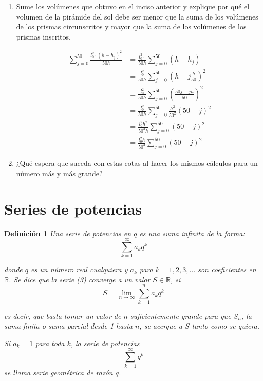 \documentclass[12pt]{article}
\begin{document}
\begin{enumerate}
    \item Sume los volúmenes que obtuvo en el inciso anterior y explique por qué el volumen de la pirámide del sol debe ser menor que la suma de los volúmenes de los prismas circunscritos y mayor que la suma de los volúmenes de los prismas inscritos.
  
        \begin{align*}
            \sum_{j=0}^{50} \frac{l_0^2 \cdot (h - h_j)^2}{50h} &= \frac{l_0^2 \cdot }{50h}  \sum_{j=0}^{50}(h - h_j)\\
            &= \frac{l_0^2}{50h}  \sum_{j=0}^{50} \left(h -j \frac{h}{50} \right)^2\\
            &= \frac{l_0^2}{50h}  \sum_{j=0}^{50} \left(\frac{50j-jh}{50} \right)^2\\
            &= \frac{l_0^2}{50h}  \sum_{j=0}^{50} \frac{h^2}{50^2} \left(50-j \right)^2\\
            &= \frac{l_0^2 h^2}{50^3h}  \sum_{j=0}^{50} \left(50-j \right)^2\\
            &= \frac{l_0^2 h}{50^3}  \sum_{j=0}^{50} \left(50-j \right)^2
        \end{align*}
  
        
    \item ¿Qué espera que suceda con estas cotas al hacer los mismos cálculos para un número más y más grande?
\end{enumerate}


\section{Series de potencias}

    {\bf Definición 1} \textit{Una serie de potencias en $q$ es una suma infinita de la forma:}\[\sum_{k=1}^{\infty} a_k q^k \tag{3}\]

    \textit{donde $q$ es un número real cualquiera y $a_k$ para $k = 1, 2, 3, \dots$ son coeficientes en $\mathbb{R}$. Se dice que la serie (3) converge a un valor $S \in \mathbb{R}$, si}\[S = \lim_{n \to \infty} \sum_{k=1}^{n} a_k q^k \tag{4}\]


    \textit{es decir, que basta tomar un valor de $n$ suficientemente grande para que $S_n$, la suma finita o suma parcial desde 1 hasta $n$, se acerque a $S$ tanto como se quiera.}

    \textit{Si $a_k = 1$ para toda $k$, la serie de potencias}
    \[\sum_{k=1}^{\infty} q^k \tag{5}\]
    \textit{se llama serie geométrica de razón $q$.}
\end{document}
